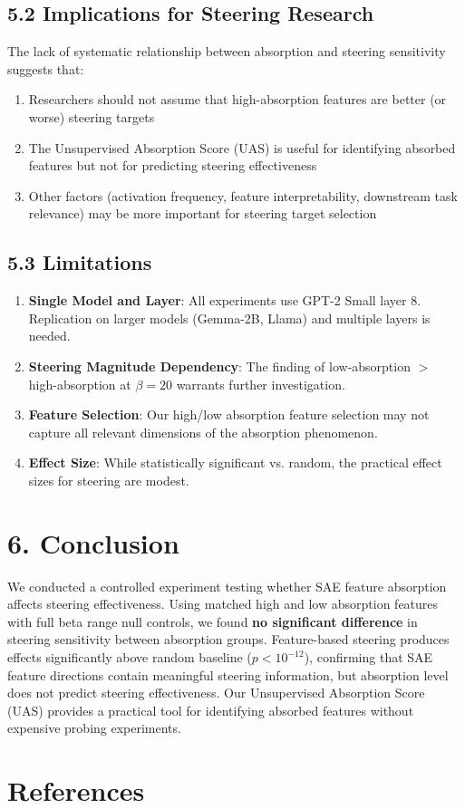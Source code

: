 \documentclass{article}
\begin{document}
\subsection{5.2 Implications for Steering Research}

The lack of systematic relationship between absorption and steering sensitivity suggests that:
\begin{enumerate}
    \item Researchers should not assume that high-absorption features are better (or worse) steering targets
    \item The Unsupervised Absorption Score (UAS) is useful for identifying absorbed features but not for predicting steering effectiveness
    \item Other factors (activation frequency, feature interpretability, downstream task relevance) may be more important for steering target selection
\end{enumerate}

\subsection{5.3 Limitations}

\begin{enumerate}
    \item \textbf{Single Model and Layer}: All experiments use GPT-2 Small layer 8. Replication on larger models (Gemma-2B, Llama) and multiple layers is needed.
    \item \textbf{Steering Magnitude Dependency}: The finding of low-absorption $>$ high-absorption at $\beta = 20$ warrants further investigation.
    \item \textbf{Feature Selection}: Our high/low absorption feature selection may not capture all relevant dimensions of the absorption phenomenon.
    \item \textbf{Effect Size}: While statistically significant vs. random, the practical effect sizes for steering are modest.
\end{enumerate}


\section{6. Conclusion}

We conducted a controlled experiment testing whether SAE feature absorption affects steering effectiveness. Using matched high and low absorption features with full beta range null controls, we found \textbf{no significant difference} in steering sensitivity between absorption groups. Feature-based steering produces effects significantly above random baseline ($p < 10^{-12}$), confirming that SAE feature directions contain meaningful steering information, but absorption level does not predict steering effectiveness. Our Unsupervised Absorption Score (UAS) provides a practical tool for identifying absorbed features without expensive probing experiments.


\section*{References}



\end{document}
